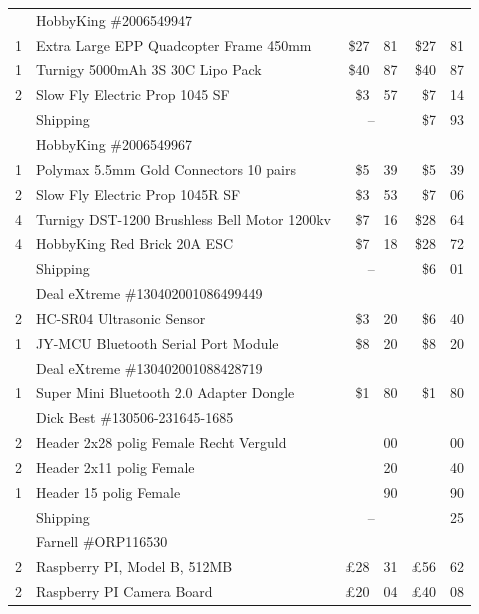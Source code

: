 \documentclass[11pt, a4paper, onecolumn, oneside, parskip=half]{scrartcl}
\begin{document}
\begin{tabular}{llr@{.}lr@{.}l}
  & \multicolumn{3}{l}{HobbyKing \#2006549947} \\ %
1 & Extra Large EPP Quadcopter Frame 450mm & \$27&81 & \$27&81 \\
1 & Turnigy 5000mAh 3S 30C Lipo Pack & \$40&87 & \$40&87 \\
2 & Slow Fly Electric Prop 1045 SF & \$3&57 &  \$7&14 \\
  & Shipping & \multicolumn{2}{c}{--} & \$7&93 \\
\hline %

  & \multicolumn{3}{l}{HobbyKing \#2006549967} \\ %
1 & Polymax 5.5mm Gold Connectors 10 pairs & \$5&39 & \$5&39 \\
2 & Slow Fly Electric Prop 1045R SF & \$3&53 & \$7&06 \\
4 & Turnigy DST-1200 Brushless Bell Motor 1200kv & \$7&16 & \$28&64 \\
4 & HobbyKing Red Brick 20A ESC & \$7&18 & \$28&72 \\
  & Shipping & \multicolumn{2}{c}{--} & \$6&01 \\
\hline %

  & \multicolumn{3}{l}{Deal eXtreme \#130402001086499449} \\ %
2 & HC-SR04 Ultrasonic Sensor & \$3&20 & \$6&40 \\
1 & JY-MCU Bluetooth Serial Port Module & \$8&20 & \$8&20 \\
\hline %

  & \multicolumn{3}{l}{Deal eXtreme \#130402001088428719} \\ %
1 & Super Mini Bluetooth 2.0 Adapter Dongle & \$1&80 & \$1&80 \\
\hline %

  & \multicolumn{3}{l}{Dick Best \#130506-231645-1685} \\ %
2 & Header 2x28 polig Female Recht Verguld & \texteuro2&00 & \texteuro4&00 \\
2 & Header 2x11 polig Female & \texteuro1&20 & \texteuro2&40 \\
1 & Header  15 polig Female & \texteuro0&90 & \texteuro0&90 \\
  & Shipping & \multicolumn{2}{c}{--} & \texteuro2&25 \\
\hline %

  & \multicolumn{3}{l}{Farnell \#ORP116530} \\ %
2 & Raspberry PI, Model B, 512MB & \pounds28&31 & \pounds56&62 \\
2 & Raspberry PI Camera Board & \pounds20&04 & \pounds40&08 \\
\hline %


\end{tabular}
\end{document}
